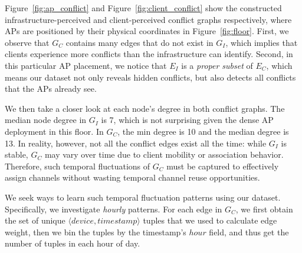 Figure~\ref{fig:ap_conflict} and Figure~\ref{fig:client_conflict} show the
constructed infrastructure-perceived and client-perceived conflict graphs
respectively, where APs are positioned by their physical coordinates in
Figure~\ref{fig:floor}. First, we observe that $G_C$ contains many edges that do
not exist in $G_I$, which implies that clients experience more conflicts than
the infrastructure can identify. Second, in this particular AP placement, we
notice that $E_I$ is a \textit{proper subset} of $E_C$, which means our dataset
not only reveals hidden conflicts, but also detects all conflicts that the APs
already see.

We then take a closer look at each node's degree in both conflict graphs.  The
median node degree in $G_I$ is 7, which is not surprising given the dense AP
deployment in this floor.  In $G_C$, the min degree is 10 and the median degree
is 13. In reality, however, not all the conflict edges exist all the time: while
$G_I$ is stable, $G_C$ may vary over time due to client mobility or association
behavior. Therefore, such temporal fluctuations of $G_C$ must be captured to
effectively assign channels without wasting temporal channel reuse
opportunities.

We seek ways to learn such temporal fluctuation patterns using our dataset.
Specifically, we investigate \textit{hourly} patterns. For each edge in
$G_C$, we first obtain the set of unique $\langle device, timestamp \rangle$
tuples that we used to calculate edge weight, then we bin the tuples by the
timestamp's $hour$ field, and thus get the number of tuples in each hour of
day.

